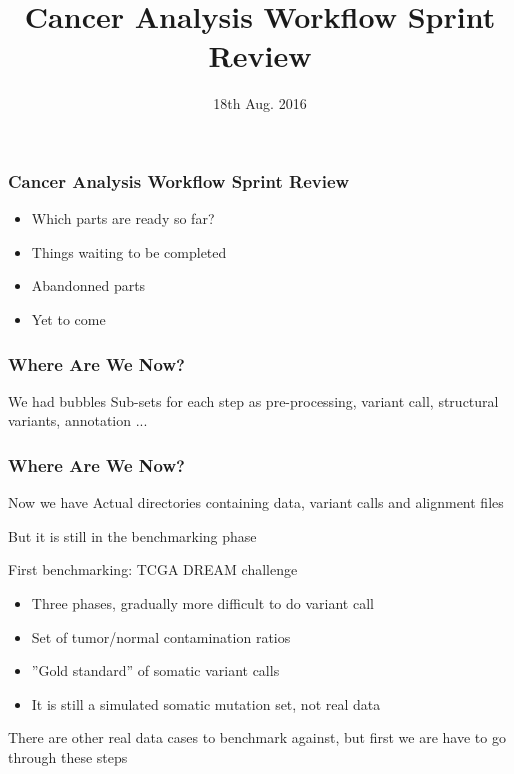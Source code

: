 \documentclass{beamer}
\title{Cancer Analysis Workflow Sprint Review}
\institute{SciLifeLab}
\date{18th Aug. 2016 }
\begin{document}
\frame{\titlepage}
			  
\begin{frame}
\frametitle{Cancer Analysis Workflow Sprint Review}
\begin{itemize}
	\item Which parts are ready so far?
	\item Things waiting to be completed
	\item Abandonned parts
	\item Yet to come
\end{itemize}
\end{frame}

\begin{frame}
\frametitle{Where Are We Now?}
\begin{block}{We had bubbles}
Sub-sets for each step as pre-processing, variant call, structural variants, annotation ...
\end{block}
\end{frame}

\begin{frame}
\frametitle{Where Are We Now?}
\begin{block}{Now we have}
	Actual directories containing data, variant calls and alignment files

	But it is still in the benchmarking phase
\end{block}
\begin{block}{First benchmarking: TCGA DREAM challenge}
	\begin{itemize}
		\item Three phases, gradually more difficult to do variant call
		\item Set of tumor/normal contamination ratios
		\item ''Gold standard'' of somatic variant calls
		\item It is still a simulated somatic mutation set, not real data
	\end{itemize}
\end{block}
There are other real data cases to benchmark against, but first we are have to go through these steps
\end{frame}
\end{document}
